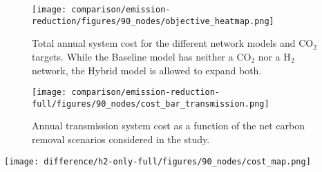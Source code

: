 \documentclass[twocolumn]{article}
\newcommand{\COtwo}{CO$_2$}
\newcommand{\Htwo}{H$_2$}
\newcommand{\Hgrid}{H$_2$\=/Grid}
\newcommand{\modBase}{Baseline model}
\newcommand{\modH}{H$_2$\=/Grid model}
\newcommand{\modHybrid}{Hybrid model}
\begin{document}

\begin{figure}
    \centering
    \texttt{[image: comparison/emission-reduction/figures/90\_nodes/objective\_heatmap.png]}
    \caption{Total annual system cost for the different network models and \COtwo{} targets. While the \modBase{} has neither a \COtwo{} nor a \Htwo{} network, the \modHybrid{} is allowed to expand both.}
    \label{fig:objective_heatmap}
\end{figure}


\begin{figure}[ht]
    \centering
    \texttt{[image: comparison/emission-reduction-full/figures/90\_nodes/cost\_bar\_transmission.png]}
    \caption{Annual transmission system cost as a function of the net carbon removal scenarios considered in the study.}
    \label{fig:cost_bar_transmission}
\end{figure}


\begin{figure*}[ht]
    \centering
    \texttt{[image: difference/h2-only-full/figures/90\_nodes/cost\_map.png]}
    \caption{Difference in cost investments between the \Hgrid{} and \modHybrid{}s. The left subfigure shows higher spendings per technology and region and transport system for the \modH{}, the right shows higher spendings in the \modHybrid{}.}
    \label{fig:cost_map_difference}
\end{figure*}
\end{document}
